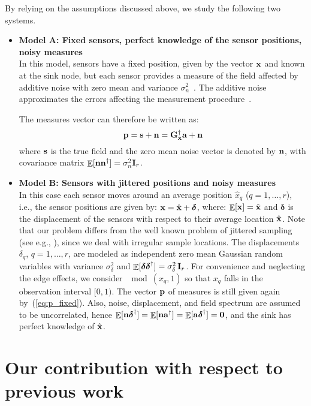 \documentclass[final, a4paper]{IEEEtran}
\newcommand{\av}{{\bf a}}
\newcommand{\nv}{{\bf n}}
\newcommand{\pv}{{\bf p}}
\newcommand{\sv}{{\bf s}}
\newcommand{\xv}{{\bf x}}
\newcommand{\zerov}{{\bf 0}}
\newcommand{\Gm}{{\bf G}}
\newcommand{\Id}{{\bf I}}
\def\xvh{{\hat{\xv}}}
\newcommand{\deltav}{\boldsymbol{\delta}}
\begin{document}
By relying on the assumptions discussed above, we study the following two systems.
\begin{itemize}
\item  {\bf Model A: Fixed sensors, perfect knowledge of the sensor positions, noisy measures}\\
In this model, sensors have a fixed position, given by the vector
$\xv$ and known at the sink node, but each sensor provides a measure
of the field affected by additive noise with zero mean and variance
$\sigma^2_n$~\cite{Vuran04}.
The additive noise approximates the errors affecting the measurement procedure~\cite{Ergen06}.


The measures vector can therefore be written as:
\begin{equation}
\pv = \sv+\nv = \Gm_\xv\Herm \av + \nv
\label{eq:p_fixed}
\end{equation}
where $\sv$ is the true field and the zero mean noise vector is denoted by
$\nv$, with covariance matrix $\EE[\nv\nv\Herm]=\sigma^2_n\Id_r$.


\item {\bf Model B: Sensors with jittered positions and noisy measures}\\
In this case each sensor moves around an average position
$\hat{x}_q$ ($q=1,\ldots,r$), i.e., the sensor positions are given
by: $\xv = \xvh + \deltav$, where: $\EE[\xv]=\xvh$ and $\deltav$ is
the displacement of the sensors with respect to their average
location $\xvh$.  Note that our problem differs from
the well known problem of jittered sampling (see e.g.,
\cite{LiuStanley}), since we deal with irregular sample locations.
The displacements $\delta_q$, $q=1,\ldots,r$, are modeled as
independent zero mean Gaussian random variables with variance
$\sigma^2_\delta$ and $\EE[\deltav\deltav\Herm]
=\sigma^2_\delta\,\Id_r$.  For convenience and
neglecting the edge effects, we consider $\mod(x_q,1)$ so that $x_q$
falls in the observation interval $[0,1)$. The vector $\pv$ of
measures is still given again by~(\ref{eq:p_fixed}). Also,  noise,
displacement, and field spectrum are assumed to be 
uncorrelated, hence $\EE[\nv\deltav\Herm] = \EE[\nv\av\Herm]=
\EE[\av\deltav\Herm] = \zerov$, and the sink has perfect knowledge
of $\xvh$.
\end{itemize}

\section{Our contribution with respect to previous work}
\label{sec:related-work}
\end{document}
